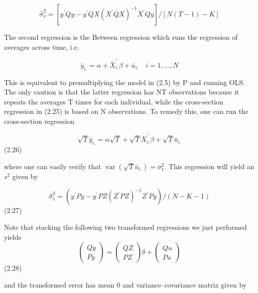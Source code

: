\documentclass[
]{book}
\begin{document}
\begin{equation}
\widehat{\sigma}_{v}^{2}=\left[y^{\prime} Q y-y^{\prime} Q X\left(X^{\prime} Q X\right)^{-1} X^{\prime} Q y\right] /[N(T-1)-K]
\end{equation}

The second regression is the Between regression which runs the regression of averages across time, i.e.

\begin{equation}
\bar{y}_{i .}=\alpha+\bar{X}_{i .}^{\prime} \beta+\bar{u}_{i .} \quad i=1, \ldots, N
\end{equation}

This is equivalent to premultiplying the model in (2.5) by P and running OLS. The only caution is that the latter regression has NT observations because it repeats the averages T times for each individual, while the cross-section regression in (2.25) is based on N observations. To remedy this, one can run the cross-section regression

\begin{equation}
\sqrt{T} \bar{y}_{i .}=\alpha \sqrt{T}+\sqrt{T} \bar{X}_{i .}^{\prime} \beta+\sqrt{T} \bar{u}_{i .}
\end{equation} (2.26)

where one can easily verify that \(\operatorname{var}\left(\sqrt{T} \bar{u}_{i .}\right)=\sigma_{1}^{2} .\) This regression will yield an \(s^{2}\) given by

\begin{equation}
\widehat{\sigma}_{1}^{2}=\left(y^{\prime} P y-y^{\prime} P Z\left(Z^{\prime} P Z\right)^{-1} Z^{\prime} P y\right) /(N-K-1)
\end{equation} (2.27)

Note that stacking the following two transformed regressions we just performed yields \begin{equation}
\left(\begin{array}{l}
Q y \\
P y
\end{array}\right)=\left(\begin{array}{l}
Q Z \\
P Z
\end{array}\right) \delta+\left(\begin{array}{c}
Q u \\
P u
\end{array}\right)
\end{equation} (2.28)

and the transformed error has mean 0 and variance--covariance matrix given by
\end{document}
